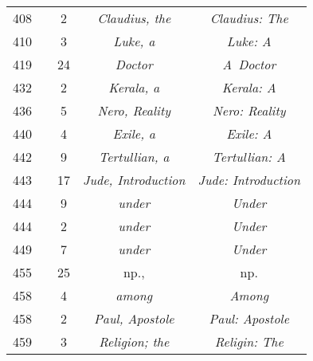 \documentclass[a4paper,11pt]{article}
\begin{document}
\begin{center}
\begin{tabular}{|c|c|c|c|c|}
    408 & &  2 & \emph{Claudius, the} & \emph{Claudius: The} \\
    410 & &  3 & \emph{Luke, a} & \emph{Luke: A} \\
    419 & & 24 & \emph{Doctor} & \emph{A~Doctor} \\
    432 & &  2 & \emph{Kerala, a} & \emph{Kerala: A} \\
    436 & &  5 & \emph{Nero, Reality} & \emph{Nero: Reality} \\
    440 & &  4 & \emph{Exile, a} & \emph{Exile: A} \\
    442 & &  9 & \emph{Tertullian, a} & \emph{Tertullian: A} \\
    443 & & 17 & \emph{Jude, Introduction} & \emph{Jude: Introduction} \\
    444 & &  9 & \emph{under} & \emph{Under} \\
    444 & &  2 & \emph{under} & \emph{Under} \\
    449 & &  7 & \emph{under} & \emph{Under} \\
    455 & & 25 & np., & np. \\
    458 & &  4 & \emph{among} & \emph{Among} \\
    458 & &  2 & \emph{Paul, Apostole} & \emph{Paul: Apostole} \\
    459 & &  3 & \emph{Religion; the} & \emph{Religin: The} \\
    \hline
  \end{tabular}



\end{center}
\end{document}
